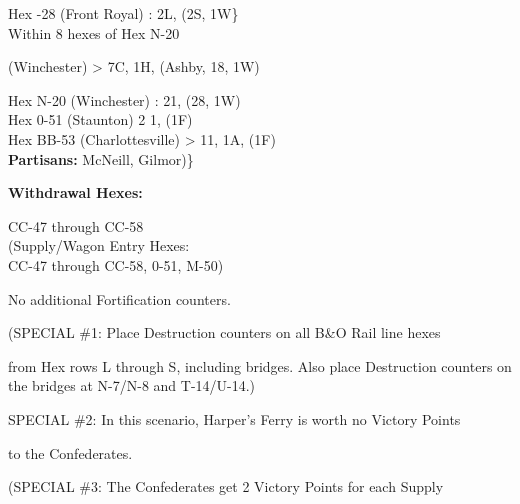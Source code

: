 \begin{scenariodata}
Hex -28 (Front Royal) : 2L, (2S, 1W\}\\
Within 8 hexes of Hex N-20\\
\end{scenariodata}

(Winchester) > 7C, 1H, (Ashby, 18, 1W)

\begin{scenariodata}
Hex N-20 (Winchester) : 21, (28, 1W)\\
Hex 0-51 (Staunton) 2 1, (1F)\\
Hex BB-53 (Charlottesville) > 11, 1A, (1F)\\
\textbf{Partisans:} McNeill, Gilmor)\}\\
\end{scenariodata}

\begin{scenariodata}
\textbf{Withdrawal Hexes:}\\
\end{scenariodata}

\begin{scenariodata}
CC-47 through CC-58\\
(Supply/Wagon Entry Hexes:\\
CC-47 through CC-58, 0-51, M-50)\\
\end{scenariodata}

\begin{scenariodata}
No additional Fortification counters.\\
\end{scenariodata}

\begin{scenariodata}
(SPECIAL \#1: Place Destruction counters on all B\&O Rail line hexes\\
\end{scenariodata}

from Hex rows L through S, including bridges. Also place Destruction counters on the bridges at N-7/N-8 and T-14/U-14.)

\begin{scenariodata}
SPECIAL \#2: In this scenario, Harper's Ferry is worth no Victory Points\\
\end{scenariodata}

to the Confederates.

\begin{scenariodata}
(SPECIAL \#3: The Confederates get 2 Victory Points for each Supply\\
\end{scenariodata}

